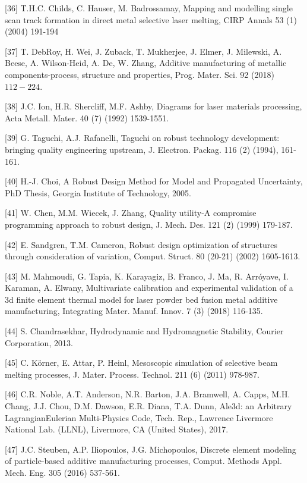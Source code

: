\documentclass[10pt]{article}
\begin{document}
[36] T.H.C. Childs, C. Hauser, M. Badrossamay, Mapping and modelling single scan track formation in direct metal selective laser melting, CIRP Annals 53 (1) (2004) 191-194

[37] T. DebRoy, H. Wei, J. Zuback, T. Mukherjee, J. Elmer, J. Milewski, A. Beese, A. Wilson-Heid, A. De, W. Zhang, Additive manufacturing of metallic components-process, structure and properties, Prog. Mater. Sci. 92 (2018) $112-224$.

[38] J.C. Ion, H.R. Shercliff, M.F. Ashby, Diagrams for laser materials processing, Acta Metall. Mater. 40 (7) (1992) 1539-1551.

[39] G. Taguchi, A.J. Rafanelli, Taguchi on robust technology development: bringing quality engineering upstream, J. Electron. Packag. 116 (2) (1994), 161-161.

[40] H.-J. Choi, A Robust Design Method for Model and Propagated Uncertainty, PhD Thesis, Georgia Institute of Technology, 2005.

[41] W. Chen, M.M. Wiecek, J. Zhang, Quality utility-A compromise programming approach to robust design, J. Mech. Des. 121 (2) (1999) 179-187.

[42] E. Sandgren, T.M. Cameron, Robust design optimization of structures through consideration of variation, Comput. Struct. 80 (20-21) (2002) 1605-1613.

[43] M. Mahmoudi, G. Tapia, K. Karayagiz, B. Franco, J. Ma, R. Arróyave, I. Karaman, A. Elwany, Multivariate calibration and experimental validation of a 3d finite element thermal model for laser powder bed fusion metal additive manufacturing, Integrating Mater. Manuf. Innov. 7 (3) (2018) 116-135.

[44] S. Chandrasekhar, Hydrodynamic and Hydromagnetic Stability, Courier Corporation, 2013.

[45] C. Körner, E. Attar, P. Heinl, Mesoscopic simulation of selective beam melting processes, J. Mater. Process. Technol. 211 (6) (2011) 978-987.

[46] C.R. Noble, A.T. Anderson, N.R. Barton, J.A. Bramwell, A. Capps, M.H. Chang, J.J. Chou, D.M. Dawson, E.R. Diana, T.A. Dunn, Ale3d: an Arbitrary LagrangianEulerian Multi-Physics Code, Tech. Rep., Lawrence Livermore National Lab. (LLNL), Livermore, CA (United States), 2017.

[47] J.C. Steuben, A.P. Iliopoulos, J.G. Michopoulos, Discrete element modeling of particle-based additive manufacturing processes, Comput. Methods Appl. Mech. Eng. 305 (2016) 537-561.
\end{document}
